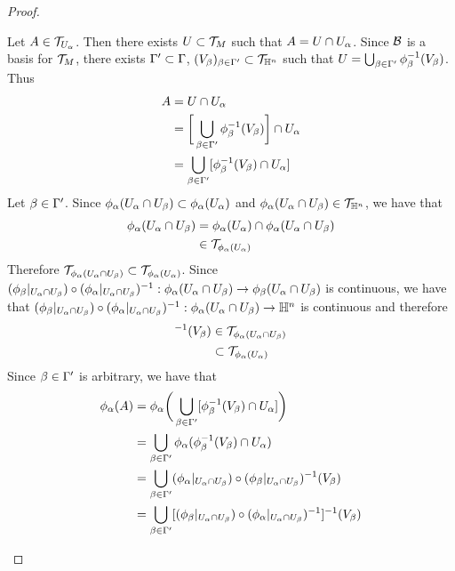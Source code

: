 \documentclass{book}
\begin{document}
\begin{proof}
\begin{enumerate}
\begin{enumerate}
				Let $A \in \mathcal{T}_{U_{\alpha}}$. Then there exists $U \subset \mathcal{T}_M$ such that $A = U \cap U_{\alpha}$. Since $\mathcal{B}$ is a basis for $\mathcal{T}_M$, there exists $\Gamma' \subset \Gamma$, $(V_{\beta})_{\beta \in \Gamma'} \subset \mathcal{T}_{\mathbb{H}^n}$ such that $U = \bigcup_{ \beta \in \Gamma'} \phi_{\beta}^{-1}(V_{\beta})$. Thus 
				\begin{align*}
					A
					& = U \cap U_{\alpha} \\
					& = \bigg[\bigcup_{\beta \in \Gamma'} \phi_{\beta}^{-1}(V_{\beta}) \bigg] \cap U_{\alpha} \\ 
					& = \bigcup_{\beta \in \Gamma'} [\phi_{\beta}^{-1}(V_{\beta}) \cap U_{\alpha}] \\
				\end{align*} 
				Let $\beta \in \Gamma'$. Since $\phi_{\alpha}(U_{\alpha} \cap U_{\beta}) \subset \phi_{\alpha}(U_{\alpha})$ and $\phi_{\alpha}(U_{\alpha} \cap U_{\beta}) \in \mathcal{T}_{\mathbb{H}^n}$, we have that
				\begin{align*}
					\phi_{\alpha}(U_{\alpha} \cap U_{\beta})
					& = \phi_{\alpha}(U_{\alpha}) \cap \phi_{\alpha}(U_{\alpha} \cap U_{\beta}) \\
					& \in \mathcal{T}_{\phi_{\alpha}(U_{\alpha})}
				\end{align*}
				Therefore $\mathcal{T}_{\phi_{\alpha}(U_{\alpha} \cap U_{\beta})} \subset \mathcal{T}_{\phi_{\alpha}(U_{\alpha})}$. Since $(\phi_{\beta}|_{U_{\alpha} \cap U_{\beta}}) \circ (\phi_{\alpha}|_{U_{\alpha} \cap U_{\beta}})^{-1}: \phi_{\alpha}(U_{\alpha} \cap U_{\beta}) \rightarrow \phi_{\beta}(U_{\alpha} \cap U_{\beta})$ is continuous, we have that $(\phi_{\beta}|_{U_{\alpha} \cap U_{\beta}}) \circ (\phi_{\alpha}|_{U_{\alpha} \cap U_{\beta}})^{-1}: \phi_{\alpha}(U_{\alpha} \cap U_{\beta}) \rightarrow \mathbb{H}^n$
				is continuous and therefore 
				\begin{align*}
					[(\phi_{\be}|_{U_{\al} \cap U_{\be}}) \circ (\phi_{\al}|_{U_{\al} \cap U_{\be}})^{-1}]^{-1}(V_{\be}) 
					& \in \MT_{\phi_{\al}(U_{\al} \cap U_{\be})} \\
					& \subset \MT_{\phi_{\al}(U_{\al})}
				\end{align*} 
				Since $\beta \in \Gamma'$ is arbitrary, we have that
				\begin{align*}
					\phi_{\al}(A)
					& = \phi_{\al} \bigg( \bigcup_{\be \in \Gam'} [\phi_{\be}^{-1}(V_{\be}) \cap U_{\al}] \bigg) \\
					& = \bigcup_{\be \in \Gam'} \phi_{\al}(\phi_{\be}^{-1}(V_{\be}) \cap U_{\al}) \\
					& =  \bigcup_{\be \in \Gam'} (\phi_{\al}|_{U_{\al} \cap U_{\be}}) \circ (\phi_{\be}|_{U_{\al} \cap U_{\be}})^{-1}(V_{\be}) \\
					& =  \bigcup_{\be \in \Gam'} [(\phi_{\be}|_{U_{\al} \cap U_{\be}}) \circ (\phi_{\al}|_{U_{\al} \cap U_{\be}})^{-1}]^{-1}(V_{\be}) \\

\end{align*}
\end{enumerate}
\end{enumerate}
\end{proof}
\end{document}
